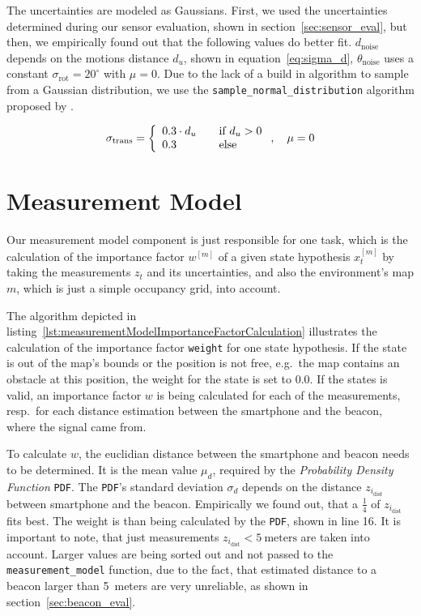 The uncertainties are modeled as Gaussians. First, we used the uncertainties determined during our sensor evaluation, shown in section~\ref{sec:sensor_eval}, but then, we empirically found out that the following values do better fit. $d_\text{noise}$ depends on the motions distance $d_u$, shown in equation~\ref{eq:sigma_d}, $\theta_\text{noise}$ uses a constant $\sigma_\text{rot} = 20^{\circ}$ with $\mu = 0$. Due to the lack of a build in algorithm to sample from a Gaussian distribution, we use the \texttt{sample\_normal\_distribution} algorithm proposed by \citet[p.~124]{thrun:prob_robo}.

\begin{equation}\label{eq:sigma_d}
	\sigma_{\text{trans}} = \left\{ 
  \begin{array}{l l}
    0.3 \cdot d_u & \quad \text{if $d_u > 0$}\\
    0.3 & \quad \text{else}
  \end{array} \right. ,\quad \mu = 0
\end{equation}


\section{Measurement Model}\label{sec:algo_measurement_model}
Our measurement model component is just responsible for one task, which is the calculation of the importance factor $w^{[m]}$ of a given state hypothesis $x^{[m]}_t$ by taking the measurements $z_t$ and its uncertainties, and also the environment's map $m$, which is just a simple occupancy grid, into account.



The algorithm depicted in listing~\ref{lst:measurementModelImportanceFactorCalculation} illustrates the calculation of the importance factor \texttt{weight} for one state hypothesis. If the state is out of the map's bounds or the position is not free, e.g.\ the map contains an obstacle at this position, the weight for the state is set to $0.0$. If the states is valid, an importance factor $w$ is being calculated for each of the measurements, resp.\ for each distance estimation between the smartphone and the beacon, where the signal came from.

To calculate $w$, the euclidian distance between the smartphone and beacon needs to be determined. It is the mean value $\mu_d$, required by the \emph{Probability Density Function} \texttt{PDF}. The \texttt{PDF}'s standard deviation $\sigma_d$ depends on the distance $z_{i_\text{dist}}$ between smartphone and the beacon. Empirically we found out, that a $\frac{1}{4}$ of $z_{i_\text{dist}}$ fits best. The weight is than being calculated by the \texttt{PDF}, shown in line 16. It is important to note, that just measurements $z_{i_\text{dist}} < 5~\text{meters}$ are taken into account. Larger values are being sorted out and not passed to the \texttt{measurement\_model} function, due to the fact, that estimated distance to a beacon larger than 5~meters are very unreliable, as shown in section~\ref{sec:beacon_eval}.

